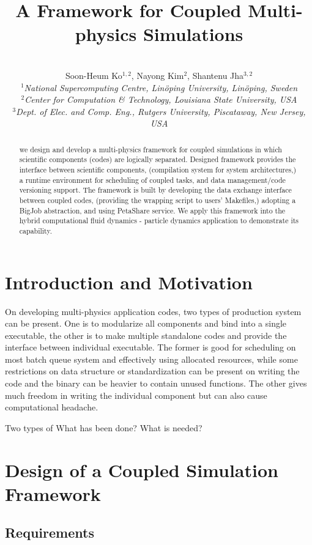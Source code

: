 \documentclass[10pt,conference]{IEEEtran}
\title{A Framework for Coupled Multi-physics Simulations \skonote{some charming title?? 
emphasizing ''it can cover various kinds of applications in different requirement, 
main components can be replaced by other similar softwares, etc.''} }
\author{
 ~\\[-2em]
 Soon-Heum Ko$^{1,2}$, Nayong Kim$^{2}$, Shantenu Jha$^{3,2}$\\
 \small{\emph{$^{1}$National Supercomputing Centre, Lin\"{o}ping University, Lin\"{o}ping, Sweden}}\\
 \small{\emph{$^{2}$Center for Computation \& Technology, Louisiana State University, USA}}\\
 \small{\emph{$^{3}$Dept. of Elec. and Comp. Eng., Rutgers University, Piscataway, New Jersey, USA}}\\
}
\newcommand{\up}{\vspace*{-1em}}
\begin{document}
\maketitle

\begin{abstract}
we design and develop a multi-physics framework for coupled simulations
in which scientific components (codes) are logically separated.
Designed framework provides the interface between scientific components,
(compilation system for system architectures,)
a runtime environment for scheduling of coupled tasks, and
data management/code versioning support.
The framework is built by developing the data exchange interface 
between coupled codes, (providing the wrapping script to users' Makefiles,)
adopting a BigJob abstraction, and using PetaShare service.
We apply this framework into the hybrid computational fluid dynamics -
particle dynamics application to demonstrate its capability.
\end{abstract}
\up\up

\section{Introduction and Motivation}
On developing multi-physics application codes, two types of production
system can be present. One is to modularize all components and bind into
a single executable, the other is to make multiple standalone codes and 
provide the interface between individual executable. The former is good for
scheduling on most batch queue system and effectively using allocated
resources, while some restrictions on data structure or standardization
can be present on writing the code and the binary can be heavier to contain
unused functions. The other gives much freedom in writing the individual 
component but can also cause computational headache.




Two types of 
What has been done?
What is needed?

\section{Design of a Coupled Simulation Framework}

\subsection{Requirements}
\end{document}
